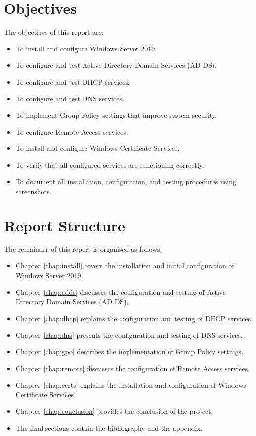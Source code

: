 \section{Objectives}
\label{sec:intro-objectives}
The objectives of this report are:
\begin{itemize}
  \item To install and configure Windows Server 2019.
  \item To configure and test Active Directory Domain Services (AD DS).
  \item To configure and test DHCP services.
  \item To configure and test DNS services.
  \item To implement Group Policy settings that improve system security.
  \item To configure Remote Access services.
  \item To install and configure Windows Certificate Services.
  \item To verify that all configured services are functioning correctly.
  \item To document all installation, configuration, and testing procedures using screenshots.
\end{itemize}

\section{Report Structure}
\label{sec:intro-structure}
The remainder of this report is organised as follows:
\begin{itemize}
  \item Chapter~\ref{chap:install} covers the installation and initial configuration of Windows Server 2019. %
  \item Chapter~\ref{chap:adds} discusses the configuration and testing of Active Directory Domain Services (AD DS). %
  \item Chapter~\ref{chap:dhcp} explains the configuration and testing of DHCP services. %
  \item Chapter~\ref{chap:dns} presents the configuration and testing of DNS services. %
  \item Chapter~\ref{chap:gpo} describes the implementation of Group Policy settings. %
  \item Chapter~\ref{chap:remote} discusses the configuration of Remote Access services. %
  \item Chapter~\ref{chap:certs} explains the installation and configuration of Windows Certificate Services. %
  \item Chapter~\ref{chap:conclusion} provides the conclusion of the project. %
  \item The final sections contain the bibliography and the appendix.
\end{itemize}
